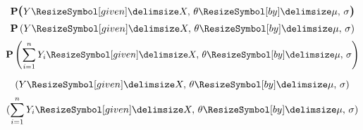 \documentclass[a4paper, fleqn]{article}
\begin{document}

\[\mathbf{P} \bm{\mathord{\mathlarger{\lparen}}} Y \given X,\, \theta \by \mu,\, \sigma \bm{\mathord{\mathlarger{\rparen}}}\]
\[\mathbf{P} \left\lparen Y \given X,\, \theta \by \mu,\, \sigma \right\rparen\]
\[\mathbf{P} \left\lparen \sum_{i=1}^{n} Y_{i} \given X,\, \theta \by \mu,\, \sigma \right\rparen\]


\[\Prob{Y \given X,\, \theta \by \mu,\, \sigma}\]
\[\Prob{\sum_{i=1}^{n} Y_{i} \given X,\, \theta \by \mu,\, \sigma}\]


\end{document}
